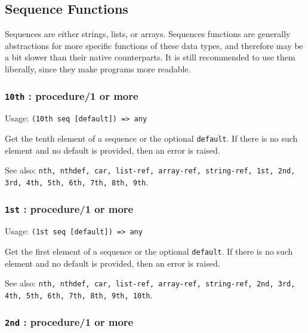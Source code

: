 \documentclass[
]{article}
\newcommand{\passthrough}[1]{#1}
\begin{document}
\hypertarget{sequence-functions}{%
\subsection{Sequence Functions}\label{sequence-functions}}

Sequences are either strings, lists, or arrays. Sequences functions are
generally abstractions for more specific functions of these data types,
and therefore may be a bit slower than their native counterparts. It is
still recommended to use them liberally, since they make programs more
readable.

\hypertarget{th-procedure1-or-more}{%
\subsubsection{\texorpdfstring{\texttt{10th} : procedure/1 or
more}{10th : procedure/1 or more}}\label{th-procedure1-or-more}}

Usage: \passthrough{\lstinline!(10th seq [default]) => any!}

Get the tenth element of a sequence or the optional
\passthrough{\lstinline!default!}. If there is no such element and no
default is provided, then an error is raised.

See also:
\passthrough{\lstinline!nth, nthdef, car, list-ref, array-ref, string-ref, 1st, 2nd, 3rd, 4th, 5th, 6th, 7th, 8th, 9th!}.

\hypertarget{st-procedure1-or-more}{%
\subsubsection{\texorpdfstring{\texttt{1st} : procedure/1 or
more}{1st : procedure/1 or more}}\label{st-procedure1-or-more}}

Usage: \passthrough{\lstinline!(1st seq [default]) => any!}

Get the first element of a sequence or the optional
\passthrough{\lstinline!default!}. If there is no such element and no
default is provided, then an error is raised.

See also:
\passthrough{\lstinline!nth, nthdef, car, list-ref, array-ref, string-ref, 2nd, 3rd, 4th, 5th, 6th, 7th, 8th, 9th, 10th!}.

\hypertarget{nd-procedure1-or-more}{%
\subsubsection{\texorpdfstring{\texttt{2nd} : procedure/1 or
more}{2nd : procedure/1 or more}}\label{nd-procedure1-or-more}}
\end{document}
